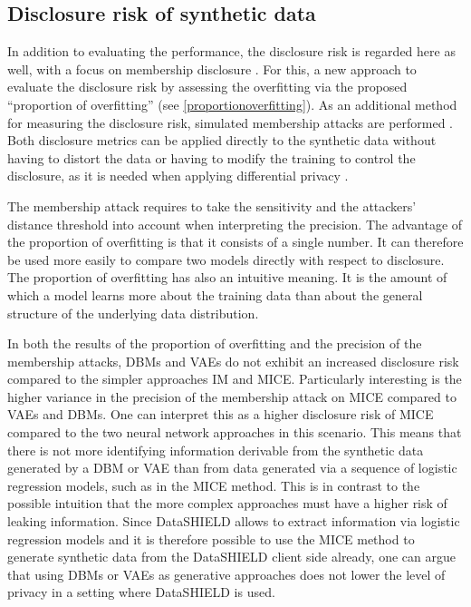 \documentclass[12pt]{article}
\begin{document}
\subsection{Disclosure risk of synthetic data}
In addition to evaluating the performance, the disclosure risk is regarded here as well, with a focus on membership disclosure \citep{li_membership_2013}.
For this, a new approach to evaluate the disclosure risk by assessing the overfitting via the proposed ``proportion of overfitting'' (see \ref{proportionoverfitting}).
As an additional method for measuring the disclosure risk, simulated membership attacks are performed \citep{goncalves}.
Both disclosure metrics can be applied directly to the synthetic data without having to distort the data or having to modify the training to control the disclosure, as it is needed when applying differential privacy \citep{dwork_differential_2008, abadi_deep_2016}.

The membership attack requires to take the sensitivity and the attackers' distance threshold  into account when interpreting the precision.
The advantage of the proportion of overfitting is that it consists of a single number.
It can therefore be used more easily to compare two models directly with respect to disclosure.
The proportion of overfitting has also an intuitive meaning.
It is the amount of which a model learns more about the training data than about the general structure of the underlying data distribution.

In both the results of the proportion of overfitting and the precision of the membership attacks, DBMs and VAEs do not exhibit an increased disclosure risk compared to the simpler approaches IM and MICE.
Particularly interesting is the higher variance in the precision of the membership attack on MICE compared to VAEs and DBMs.
One can interpret this as a higher disclosure risk of MICE compared to the two neural network approaches in this scenario.
This means that there is not more identifying information derivable from the synthetic data generated by a DBM or VAE than from data generated via a sequence of logistic regression models, such as in the MICE method.
This is in contrast to the possible intuition that the more complex approaches must have a higher risk of leaking information.
Since DataSHIELD allows to extract information via logistic regression models and it is therefore possible to use the MICE method to generate synthetic data from the DataSHIELD client side already, one can argue that using DBMs or VAEs as generative approaches does not lower the level of privacy in a setting where DataSHIELD is used.
\end{document}

